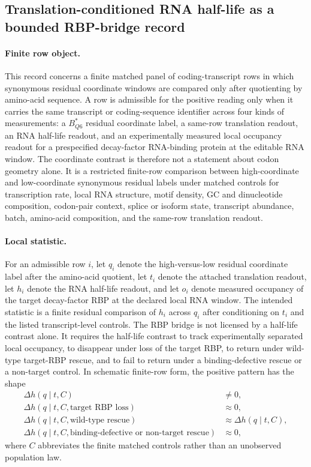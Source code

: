 \subsection{Translation-conditioned RNA half-life as a bounded RBP-bridge record}\label{sec:q6-translation-conditioned-rna-half-life-rbp-bridge-cross-layer}

\paragraph{Finite row object.}
This record concerns a finite matched panel of coding-transcript rows in which synonymous residual coordinate windows are compared only after quotienting by amino-acid sequence.  A row is admissible for the positive reading only when it carries the same transcript or coding-sequence identifier across four kinds of measurements: a $B^*_{Q6}$ residual coordinate label, a same-row translation readout, an RNA half-life readout, and an experimentally measured local occupancy readout for a prespecified decay-factor RNA-binding protein at the editable RNA window.  The coordinate contrast is therefore not a statement about codon geometry alone.  It is a restricted finite-row comparison between high-coordinate and low-coordinate synonymous residual labels under matched controls for transcription rate, local RNA structure, motif density, GC and dinucleotide composition, codon-pair context, splice or isoform state, transcript abundance, batch, amino-acid composition, and the same-row translation readout.

\paragraph{Local statistic.}
For an admissible row $i$, let $q_i$ denote the high-versus-low residual coordinate label after the amino-acid quotient, let $t_i$ denote the attached translation readout, let $h_i$ denote the RNA half-life readout, and let $o_i$ denote measured occupancy of the target decay-factor RBP at the declared local RNA window.  The intended statistic is a finite residual comparison of $h_i$ across $q_i$ after conditioning on $t_i$ and the listed transcript-level controls.  The RBP bridge is not licensed by a half-life contrast alone.  It requires the half-life contrast to track experimentally separated local occupancy, to disappear under loss of the target RBP, to return under wild-type target-RBP rescue, and to fail to return under a binding-defective rescue or a non-target control.  In schematic finite-row form, the positive pattern has the shape
$$
\begin{aligned}
  \Delta h(q\mid t, C) &\neq 0,\\
  \Delta h(q\mid t, C, \text{target RBP loss}) &\approx 0,\\
  \Delta h(q\mid t, C, \text{wild-type rescue}) &\approx \Delta h(q\mid t, C),\\
  \Delta h(q\mid t, C, \text{binding-defective or non-target rescue}) &\approx 0,
\end{aligned}
$$
where $C$ abbreviates the finite matched controls rather than an unobserved population law.

